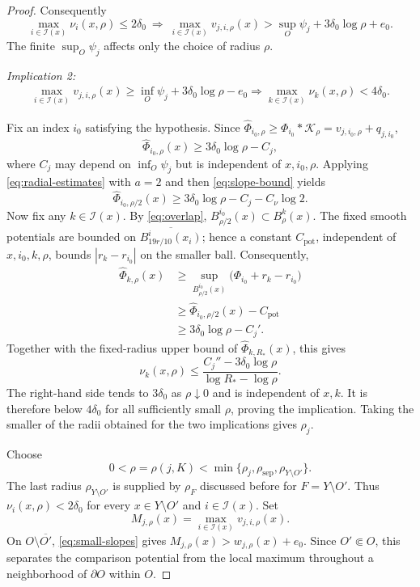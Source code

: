 \documentclass[reqno]{amsart}
\theoremstyle{remark}
\theoremstyle{plain}
\begin{document}
\begin{proof}
Consequently
\begin{equation}\label{eq:small-slopes}
\max_{i\in \mathcal I(x)}\nu_i(x,\rho)\le2\delta_0
\ \Longrightarrow\
\max_{i\in \mathcal{I}(x)} v_{j,i,\rho}(x)>\sup_O\psi_j+3\delta_0\log\rho+e_0.
\end{equation}
 The finite \(\sup_O\psi_j\) affects only the choice of radius $\rho$.

\emph{Implication 2:}
\begin{equation}\label{eq:active-slopes}
\begin{gathered}
\max_{i\in\mathcal I(x)}v_{j,i,\rho}(x)
\ge\inf_O\psi_j+3\delta_0\log\rho-e_0
\Longrightarrow
\max_{k\in\mathcal I(x)}\nu_k(x,\rho)<4\delta_0.
\end{gathered}
\end{equation}

Fix an index \(i_0\) satisfying the hypothesis. 
Since
\(\widehat{\Phi}_{i_0,\rho}\ge\Phi_{i_0}*\mathcal{K}_\rho=v_{j,i_0,\rho}+q_{j,i_0}\),
\[
\widehat{\Phi}_{i_0,\rho}(x)
\ge3\delta_0\log\rho-C_j,
\]
where \(C_j\) may depend on \(\inf_O\psi_j\) but is independent of \(x,i_0,\rho\). Applying \eqref{eq:radial-estimates} with \(a=2\) and then \eqref{eq:slope-bound} yields
\[
\widehat{\Phi}_{i_0,\rho/2}(x)
\ge3\delta_0\log\rho-C_j-C_\nu\log2.
\]
Now fix any \(k\in\mathcal I(x)\). By \eqref{eq:overlap},
\(B_{\rho/2}^{i_0}(x)\subset B_\rho^k(x)\). The fixed smooth potentials are bounded on \(\overline{B_{19r/10}^i(x_i)}\); hence a constant \(C_{\mathrm{pot}}\), independent of \(x,i_0,k,\rho\), bounds \(|r_k-r_{i_0}|\) on the smaller ball. Consequently,
\[
\begin{aligned}
\widehat{\Phi}_{k,\rho}(x)
&\ge\sup_{B_{\rho/2}^{i_0}(x)}
\bigl(\Phi_{i_0}+r_k-r_{i_0}\bigr)\\
&\ge\widehat{\Phi}_{i_0,\rho/2}(x)-C_{\mathrm{pot}}\\
&\ge3\delta_0\log\rho-C_j'.
\end{aligned}
\]
Together with the fixed-radius upper bound of  $\widehat{\Phi}_{k,R_*}(x)$, this gives
\[
\nu_k(x,\rho)
\le\frac{C_j''-3\delta_0\log\rho}{\log R_*-\log\rho}.
\]
The right-hand side tends to \(3\delta_0\) as \(\rho\downarrow0\) and is independent of \(x,k\). It is therefore below \(4\delta_0\) for all sufficiently small \(\rho\), proving the implication. 
Taking the smaller of the radii obtained for the two implications gives \(\rho_j\). 



Choose 
\[
0<\rho=\rho(j,K)<
\min\{\rho_j,\rho_{\mathrm{sep}},\rho_{Y\setminus O'}\}.
\]
The last radius $\rho_{Y\setminus O'}$ is supplied by $\rho_F$ discussed before for $F=Y\setminus O'$.
Thus
\(\nu_i(x,\rho)<2\delta_0\) for every \(x\in Y\setminus O'\) and \(i\in\mathcal I(x)\).
Set 
\[
M_{j,\rho}(x)=\max_{i\in\mathcal I(x)}v_{j,i,\rho}(x).
\]
On \(O\setminus\overline{O'}\), \eqref{eq:small-slopes} gives
\(M_{j,\rho}(x)>w_{j,\rho}(x)+e_0\). Since \(O'\Subset O\), this separates the comparison potential from the local maximum throughout a neighborhood of \(\partial O\) within \(O\).


\end{proof}
\end{document}
